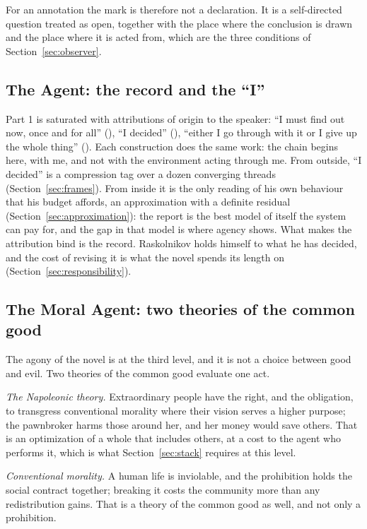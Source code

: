 For an annotation the mark is therefore not a declaration. It is a self-directed question treated as
open, together with the place where the conclusion is drawn and the place where it is acted from, which
are the three conditions of Section~\ref{sec:observer}.

\subsection*{The Agent: the record and the ``I''}

Part 1 is saturated with attributions of origin to the speaker: ``I must find out now, once and for
all'' (\emph{}), ``I decided'' (\emph{}), ``either I go through
with it or I give up the whole thing'' (\emph{}). Each construction does
the same work: the chain begins here, with me, and not with the environment acting through me. From
outside, ``I decided'' is a compression tag over a dozen converging threads
(Section~\ref{sec:frames}). From inside it is the only reading of his own behaviour that his budget
affords, an approximation with a definite residual (Section~\ref{sec:approximation}): the report is the
best model of itself the system can pay for, and the gap in that model is where agency shows. What makes
the attribution bind is the record. Raskolnikov holds himself to what he has decided, and the cost of
revising it is what the novel spends its length on (Section~\ref{sec:responsibility}).

\subsection*{The Moral Agent: two theories of the common good}

The agony of the novel is at the third level, and it is not a choice between good and evil. Two theories
of the common good evaluate one act.

\emph{The Napoleonic theory.} Extraordinary people have the right, and the obligation, to transgress
conventional morality where their vision serves a higher purpose; the pawnbroker harms those around
her, and her money would save others. That is an optimization of a whole that includes others, at a cost
to the agent who performs it, which is what Section~\ref{sec:stack} requires at this level.

\emph{Conventional morality.} A human life is inviolable, and the prohibition holds the social contract
together; breaking it costs the community more than any redistribution gains. That is a theory of the
common good as well, and not only a prohibition.


